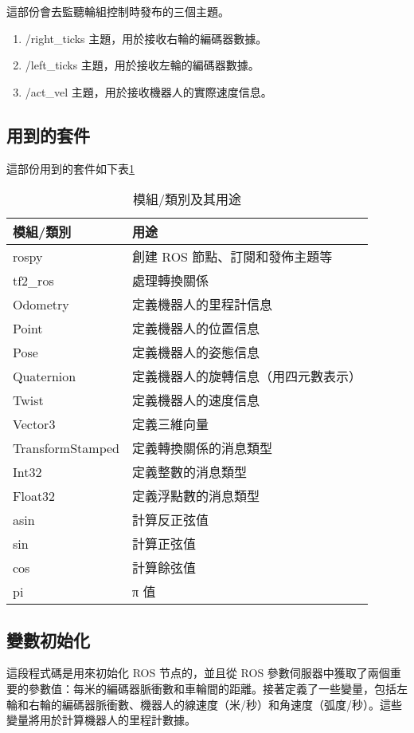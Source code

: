 這部份會去監聽輪組控制時發布的三個主題。
\begin{enumerate}
    \item /right\_ticks 主題，用於接收右輪的編碼器數據。
    \item /left\_ticks 主題，用於接收左輪的編碼器數據。
    \item /act\_vel 主題，用於接收機器人的實際速度信息。
\end{enumerate}
\subsection{用到的套件}
這部份用到的套件如下表\ref{tab:modules_and_usage}
\begin{table}[ht]
\centering
\caption{模組/類別及其用途}
\label{tab:modules_and_usage}
\begin{tabular}{|l|p{10cm}|}
\hline
\textbf{模組/類別} & \textbf{用途} \\
\hline
rospy & 創建 ROS 節點、訂閱和發佈主題等 \\
tf2\_ros & 處理轉換關係 \\
Odometry & 定義機器人的里程計信息 \\
Point & 定義機器人的位置信息 \\
Pose & 定義機器人的姿態信息 \\
Quaternion & 定義機器人的旋轉信息（用四元數表示） \\
Twist & 定義機器人的速度信息 \\
Vector3 & 定義三維向量 \\
TransformStamped & 定義轉換關係的消息類型 \\
Int32 & 定義整數的消息類型 \\
Float32 & 定義浮點數的消息類型 \\
asin & 計算反正弦值 \\
sin & 計算正弦值 \\
cos & 計算餘弦值 \\
pi & π 值 \\
\hline
\end{tabular}
\end{table}

\subsection{變數初始化}
這段程式碼是用來初始化 ROS 节点的，並且從 ROS 參數伺服器中獲取了兩個重要的參數值：每米的編碼器脈衝數和車輪間的距離。接著定義了一些變量，包括左輪和右輪的編碼器脈衝數、機器人的線速度（米/秒）和角速度（弧度/秒）。這些變量將用於計算機器人的里程計數據。

